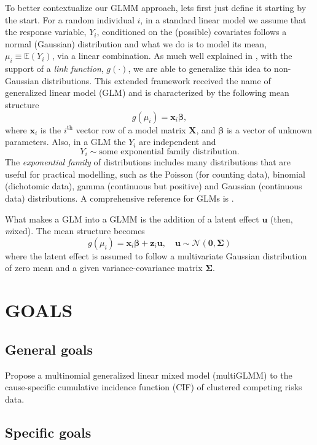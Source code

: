To better contextualize our GLMM approach, lets first just define it
starting by the start. For a random individual \(i\), in a standard
linear model we assume that the response variable, \(Y_{i}\),
conditioned on the (possible) covariates follows a normal (Gaussian)
distribution and what we do is to model its mean, \(\mu_{i} \equiv
\mathbb{E}(Y_{i})\), via a linear combination. As much well explained in
, with the support of a \textit{link function},
\(g(\cdot)\), we are able to generalize this idea to non-Gaussian
distributions. This extended framework received the name of generalized
linear model (GLM) and is characterized by the following mean structure
\[
 g(\mu_{i}) = \bm{x}_{i}\bm{\beta},
\]
where \(\bm{x}_{i}\) is the \(i^\text{th}\) vector row of a model matrix
\(\bm{X}\), and \(\bm{\beta}\) is a vector of unknown parameters. Also,
in a GLM the \(Y_{i}\) are independent and
\[
  Y_{i} \sim \text{some exponential family distribution}.
\]
The \textit{exponential family} of distributions includes many
distributions that are useful for practical modelling, such as the
Poisson (for counting data), binomial (dichotomic data), gamma
(continuous but positive) and Gaussian (continuous data) distributions.
A comprehensive reference for GLMs is .

What makes a GLM into a GLMM \cite{GLMM} is the addition of a latent
effect \(\mathbf{u}\) (then, \textit{m}ixed). The mean structure becomes
\[
  g(\mu_{i}) = \bm{x}_{i}\bm{\beta} + \mathbf{z}_{i}\mathbf{u},
  \quad \mathbf{u} \sim \mathcal{N}(\mathbf{0},\bm{\Sigma})
\]
where the latent effect is assumed to follow a multivariate Gaussian
distribution of zero mean and a given variance-covariance matrix
\(\bm{\Sigma}\).

\section{GOALS}

\subsection{General goals}

Propose a multinomial generalized linear mixed model (multiGLMM) to the
cause-specific cumulative incidence function (CIF) of clustered
competing risks data.

\subsection{Specific goals}

